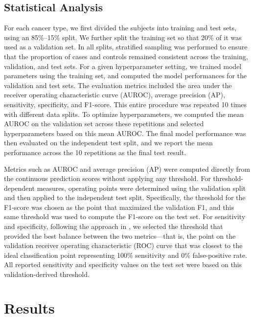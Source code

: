 \documentclass[diagnostics,article,submit,pdftex,moreauthors]{Definitions/mdpi}
\begin{document}
\subsection{Statistical Analysis}
For each cancer type, we first divided the subjects into training and test sets, using an 85\%--15\% split. 
We further split the training set so that 20\% of it was used as a validation set. 
In all splits, stratified sampling was performed to ensure that the proportion of cases and controls remained consistent across the training, validation, and test sets. 
For a given hyperparameter setting, we trained model parameters using the training set, and computed the model performances for the validation and test sets. 
The evaluation metrics included the area under the receiver operating characteristic curve (AUROC), average precision (AP), sensitivity, specificity, and F1-score. 
This entire procedure was repeated 10 times with different data splits. 
To optimize hyperparameters, we computed the mean AUROC on the validation set across these repetitions and selected hyperparameters based on this mean AUROC. 
The final model performance was then evaluated on the independent test split, and we report the mean performance across the 10 repetitions as the final test result. 

Metrics such as AUROC and average precision (AP) were computed directly from the continuous prediction scores without applying any threshold. 
For threshold-dependent measures, operating points were determined using the validation split and then applied to the independent test split. 
Specifically, the threshold for the F1-score was chosen as the point that maximized the validation F1, and this same threshold was used to compute the F1-score on the test set. 
For sensitivity and specificity, following the approach in \citep{read2023cancers}, we selected the threshold that provided the best balance between the two metrics—that is, the point on the validation receiver operating characteristic (ROC) curve that was closest to the ideal classification point representing 100\% sensitivity and 0\% false-positive rate. 
All reported sensitivity and specificity values on the test set were based on this validation-derived threshold.




\section{Results}
\end{document}
